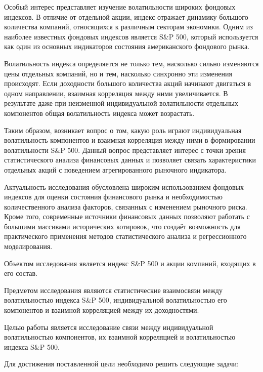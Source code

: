 \documentclass[12pt]{article}
\begin{document}
Особый интерес представляет изучение волатильности широких фондовых индексов. В отличие от отдельной акции, индекс отражает динамику большого количества компаний, относящихся к различным секторам экономики. Одним из наиболее известных фондовых индексов является S\&P 500, который используется как один из основных индикаторов состояния американского фондового рынка.

Волатильность индекса определяется не только тем, насколько сильно изменяются цены отдельных компаний, но и тем, насколько синхронно эти изменения происходят. Если доходности большого количества акций начинают двигаться в одном направлении, взаимная корреляция между ними увеличивается. В результате даже при неизменной индивидуальной волатильности отдельных компонентов общая волатильность индекса может возрастать.

Таким образом, возникает вопрос о том, какую роль играют индивидуальная волатильность компонентов и взаимная корреляция между ними в формировании волатильности S\&P 500. Данный вопрос представляет интерес с точки зрения статистического анализа финансовых данных и позволяет связать характеристики отдельных акций с поведением агрегированного рыночного индикатора.

Актуальность исследования обусловлена широким использованием фондовых индексов для оценки состояния финансового рынка и необходимостью количественного анализа факторов, связанных с изменением рыночного риска. Кроме того, современные источники финансовых данных позволяют работать с большими массивами исторических котировок, что создаёт возможность для практического применения методов статистического анализа и регрессионного моделирования.

Объектом исследования является индекс S\&P 500 и акции компаний, входящих в его состав.

Предметом исследования являются статистические взаимосвязи между волатильностью индекса S\&P 500, индивидуальной волатильностью его компонентов и взаимной корреляцией между их доходностями.

Целью работы является исследование связи между индивидуальной волатильностью компонентов, их взаимной корреляцией и волатильностью индекса S\&P 500.

Для достижения поставленной цели необходимо решить следующие задачи:
\end{document}
